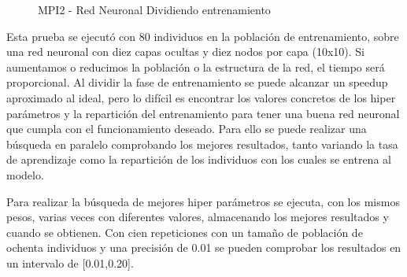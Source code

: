 			\begin{figure}[!h]
				\centering
				\caption{MPI2 - Red Neuronal Dividiendo entrenamiento}
			\end{figure}
			
			Esta prueba se ejecutó con 80 individuos en la población de entrenamiento, sobre una red neuronal con diez capas ocultas y diez nodos por capa (10x10). Si aumentamos o reducimos la población o la estructura de la red, el tiempo será proporcional.
			Al dividir la fase de entrenamiento se puede alcanzar un speedup aproximado al ideal, pero lo difícil es encontrar los valores concretos de los hiper parámetros y la repartición del entrenamiento para tener una buena red neuronal que cumpla con el funcionamiento deseado. Para ello se puede realizar una búsqueda en paralelo comprobando los mejores resultados, tanto variando la tasa de aprendizaje como la repartición de los individuos con los cuales se entrena al modelo.
			
			Para realizar la búsqueda de mejores hiper parámetros se ejecuta, con los mismos pesos, varias veces con diferentes valores, almacenando los mejores resultados y cuando se obtienen. Con cien repeticiones con un tamaño de población de ochenta individuos y una precisión de 0.01 se pueden comprobar los resultados en un intervalo de [0.01,0.20].


